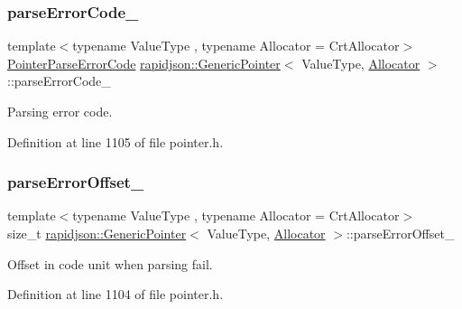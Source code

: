 \subsubsection{\texorpdfstring{parseErrorCode\_}{parseErrorCode\_}}
{\footnotesize\ttfamily template$<$typename Value\+Type , typename Allocator  = Crt\+Allocator$>$ \\
\mbox{\hyperlink{group___r_a_p_i_d_j_s_o_n___e_r_r_o_r_s_gade540ee4cc2a416c23b8ee2c12393c7b}{Pointer\+Parse\+Error\+Code}} \mbox{\hyperlink{classrapidjson_1_1_generic_pointer}{rapidjson\+::\+Generic\+Pointer}}$<$ Value\+Type, \mbox{\hyperlink{classrapidjson_1_1_allocator}{Allocator}} $>$\+::parse\+Error\+Code\+\_\+}



Parsing error code. 



Definition at line 1105 of file pointer.\+h.

\mbox{\label{classrapidjson_1_1_generic_pointer_a28e0ba01bc383d2fe7d54a450e35cd7a}} 
\subsubsection{\texorpdfstring{parseErrorOffset\_}{parseErrorOffset\_}}
{\footnotesize\ttfamily template$<$typename Value\+Type , typename Allocator  = Crt\+Allocator$>$ \\
size\+\_\+t \mbox{\hyperlink{classrapidjson_1_1_generic_pointer}{rapidjson\+::\+Generic\+Pointer}}$<$ Value\+Type, \mbox{\hyperlink{classrapidjson_1_1_allocator}{Allocator}} $>$\+::parse\+Error\+Offset\+\_\+}



Offset in code unit when parsing fail. 



Definition at line 1104 of file pointer.\+h.

\mbox{\label{classrapidjson_1_1_generic_pointer_acb657759c16fa63da15186db8c29122b}} 
